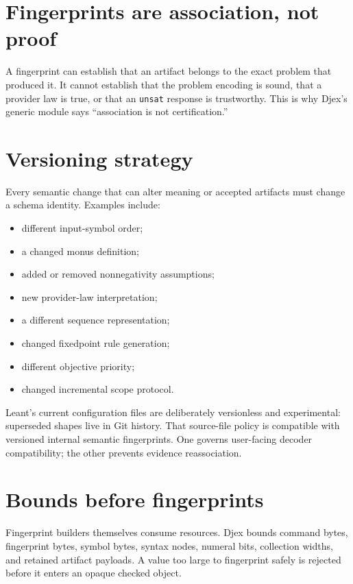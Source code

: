 \documentclass[10pt,letterpaper,oneside]{report}
\newcommand{\unsat}{\texttt{unsat}}
\begin{document}
\section{Fingerprints are association, not proof}

A fingerprint can establish that an artifact belongs to the exact problem that produced it. It cannot establish that the problem encoding is sound, that a provider law is true, or that an \unsat{} response is trustworthy. This is why Djex's generic module says ``association is not certification.''

\section{Versioning strategy}

Every semantic change that can alter meaning or accepted artifacts must change a schema identity. Examples include:

\begin{itemize}
\item different input-symbol order;
\item a changed monus definition;
\item added or removed nonnegativity assumptions;
\item new provider-law interpretation;
\item a different sequence representation;
\item changed fixedpoint rule generation;
\item different objective priority;
\item changed incremental scope protocol.
\end{itemize}

Leant's current configuration files are deliberately versionless and experimental: superseded shapes live in Git history. That source-file policy is compatible with versioned internal semantic fingerprints. One governs user-facing decoder compatibility; the other prevents evidence reassociation.

\section{Bounds before fingerprints}

Fingerprint builders themselves consume resources. Djex bounds command bytes, fingerprint bytes, symbol bytes, syntax nodes, numeral bits, collection widths, and retained artifact payloads. A value too large to fingerprint safely is rejected before it enters an opaque checked object.
\end{document}
